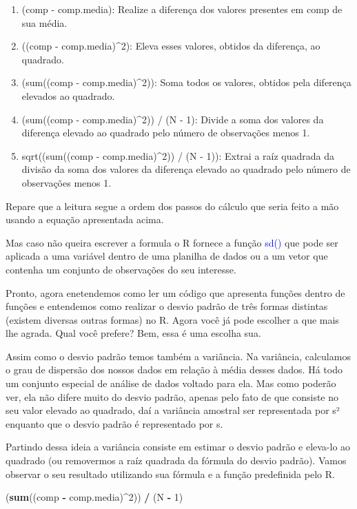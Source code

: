 \documentclass[titlepage, oneside, openany, a4paper]{book}
\newenvironment{Shaded}{\begin{snugshade}}{\end{snugshade}}
\newcommand{\DecValTok}[1]{\textcolor[rgb]{0.00,0.00,0.81}{#1}}
\newcommand{\KeywordTok}[1]{\textcolor[rgb]{0.13,0.29,0.53}{\textbf{#1}}}
\newcommand{\NormalTok}[1]{#1}
\newcommand{\OperatorTok}[1]{\textcolor[rgb]{0.81,0.36,0.00}{\textbf{#1}}}
\newcommand{\StringTok}[1]{\textcolor[rgb]{0.31,0.60,0.02}{#1}}
\providecommand{\tightlist}{%
  \setlength{\itemsep}{0pt}\setlength{\parskip}{0pt}}
\begin{document}
\begin{enumerate}
\def\labelenumi{\arabic{enumi}.}
\tightlist
\item
  (comp - comp.media): Realize a diferença dos valores presentes em comp de sua média.
\item
  ((comp - comp.media)\^{}2): Eleva esses valores, obtidos da diferença, ao quadrado.
\item
  (sum((comp - comp.media)\^{}2)): Soma todos os valores, obtidos pela diferença elevados ao quadrado.
\item
  (sum((comp - comp.media)\^{}2)) / (N - 1): Divide a soma dos valores da diferença elevado ao quadrado pelo número de observações menos 1.
\item
  sqrt((sum((comp - comp.media)\^{}2)) / (N - 1)): Extrai a raíz quadrada da divisão da soma dos valores da diferença elevado ao quadrado pelo número de observações menos 1.
\end{enumerate}

Repare que a leitura segue a ordem dos passos do cálculo que seria feito a mão usando a equação apresentada acima.

Mas caso não queira escrever a formula o R fornece a função \textcolor{blue}{sd()} que pode ser aplicada a uma variável dentro de uma planilha de dados ou a um vetor que contenha um conjunto de observações do seu interesse.

Pronto, agora enetendemos como ler um código que apresenta funções dentro de funções e entendemos como realizar o desvio padrão de três formas distintas (existem diversas outras formas) no R. Agora você já pode escolher a que mais lhe agrada. Qual você prefere? Bem, essa é uma escolha sua.

Assim como o desvio padrão temos também a variância. Na variância, calculamos o grau de dispersão dos nossos dados em relação à média desses dados. Há todo um conjunto especial de análise de dados voltado para ela. Mas como poderão ver, ela não difere muito do desvio padrão, apenas pelo fato de que consiste no seu valor elevado ao quadrado, daí a variância amostral ser representada por s² enquanto que o desvio padrão é representado por s.

Partindo dessa ideia a variância consiste em estimar o desvio padrão e eleva-lo ao quadrado (ou removermos a raíz quadrada da fórmula do desvio padrão). Vamos observar o seu resultado utilizando sua fórmula e a função predefinida pelo R.

\begin{Shaded}
\begin{Highlighting}[]
\NormalTok{(}\KeywordTok{sum}\NormalTok{((comp }\OperatorTok{-}\StringTok{ }\NormalTok{comp.media)}\OperatorTok{^}\DecValTok{2}\NormalTok{)) }\OperatorTok{/}\StringTok{ }\NormalTok{(N }\OperatorTok{-}\StringTok{ }\DecValTok{1}\NormalTok{)}
\end{Highlighting}
\end{Shaded}
\end{document}
